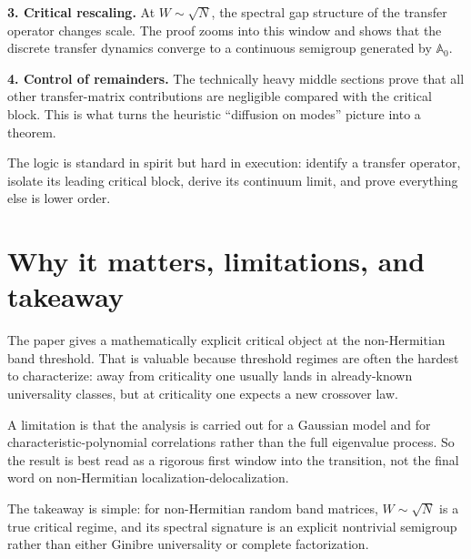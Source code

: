\documentclass[11pt]{article}
\begin{document}
\textbf{3. Critical rescaling.} At $W\sim\sqrt N$, the spectral gap structure of the transfer operator changes scale. The proof zooms into this window and shows that the discrete transfer dynamics converge to a continuous semigroup generated by $\mathbb A_0$.

\textbf{4. Control of remainders.} The technically heavy middle sections prove that all other transfer-matrix contributions are negligible compared with the critical block. This is what turns the heuristic ``diffusion on modes'' picture into a theorem.

The logic is standard in spirit but hard in execution: identify a transfer operator, isolate its leading critical block, derive its continuum limit, and prove everything else is lower order.

\section*{Why it matters, limitations, and takeaway}
The paper gives a mathematically explicit critical object at the non-Hermitian band threshold. That is valuable because threshold regimes are often the hardest to characterize: away from criticality one usually lands in already-known universality classes, but at criticality one expects a new crossover law.

A limitation is that the analysis is carried out for a Gaussian model and for characteristic-polynomial correlations rather than the full eigenvalue process. So the result is best read as a rigorous first window into the transition, not the final word on non-Hermitian localization-delocalization.

The takeaway is simple: for non-Hermitian random band matrices, $W\sim\sqrt N$ is a true critical regime, and its spectral signature is an explicit nontrivial semigroup rather than either Ginibre universality or complete factorization.
\end{document}
